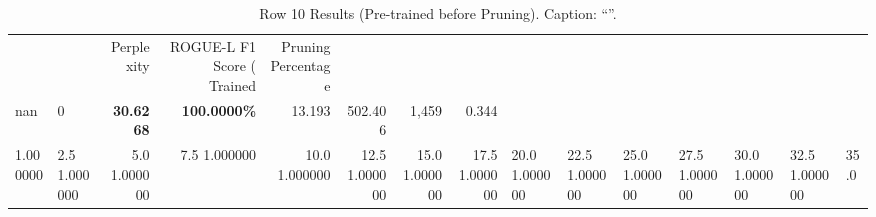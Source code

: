 \begin{table}
\caption{Row 10 Results (Pre-trained before Pruning). \ifshowcaption{}Caption: ``''.\fi}
\label{tab:evaluation-pipeline-10-trained}
\begin{tabular}{llrrrrrr}
 &  & Perplexity & ROGUE-L F1 Score (%
Trained & Pruning Percentage &  &  &  &  &  &  \\
nan & 0 & \bfseries 30.6268 & \bfseries 100.0000\% & 13.193 & 502.406 & 1,459 & 0.344 \\
1.000000 & 2.5%
1.000000 & 5.0%
1.000000 & 7.5%
1.000000 & 10.0%
1.000000 & 12.5%
1.000000 & 15.0%
1.000000 & 17.5%
1.000000 & 20.0%
1.000000 & 22.5%
1.000000 & 25.0%
1.000000 & 27.5%
1.000000 & 30.0%
1.000000 & 32.5%
1.000000 & 35.0%

\end{tabular}
\end{table}

